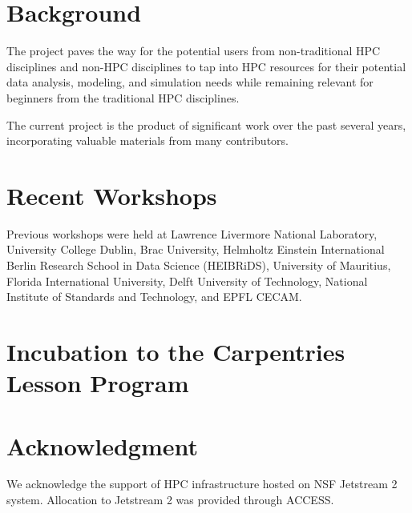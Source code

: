 \section{Background}

The project paves the way for the potential users from non-traditional HPC disciplines and non-HPC disciplines to tap into HPC resources for their potential data analysis, modeling, and simulation needs while remaining relevant for beginners from the traditional HPC disciplines.

The current project is the product of significant work over the past several years, incorporating valuable materials from many contributors.

\section{Recent Workshops}

Previous workshops were held at Lawrence Livermore National Laboratory, University College Dublin, Brac University, Helmholtz Einstein International Berlin Research School in Data Science (HEIBRiDS), University of Mauritius, Florida International University, Delft University of Technology, National Institute of Standards and Technology, and EPFL CECAM.


\section{Incubation to the Carpentries Lesson Program}


\section{Acknowledgment}

We acknowledge the support of HPC infrastructure hosted on NSF Jetstream 2 system. Allocation to Jetstream 2 was provided through ACCESS.

